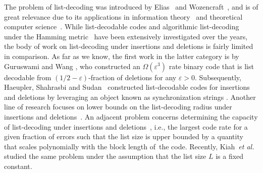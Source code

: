 \documentclass[conference, a4paper]{IEEEtran}
\begin{document}
The problem of list-decoding was introduced by Elias~\cite{elias1957list} and Wozencraft~\cite{wozencraft1958list}, and is of great relevance due to its applications in information theory~\cite{ahlswedeChannelCapacitiesList1973, Blinovskii1986, eliasErrorcorrectingCodesList1991} and theoretical computer science~\cite{caiHardnessPermanent1999, guruswami2009unbalanced, sivakumarMembershipComparableSets1999, sudanPseudorandomGeneratorsXOR2001, lund2020list}. While list-decodable codes and algorithmic list-decoding under the Hamming metric~\cite{elias1957list, wozencraft1958list, sudan1997decoding, guruswami1998improved, sudanListDecodingAlgorithms2000, guruswamiAlgorithmicResultsList2006, guruswamiExplicitCodesAchieving2008, perniceListDecodingCapacityImplies2025, fathollahiTimeSpaceEfficientList2026} have been extensively investigated over the years, the body of work on list-decoding under insertions and deletions is fairly limited in comparison. As far as we know, the first work in the latter category is by Guruswami and Wang \cite{guruswami2017deletion}, who constructed an $\Omega(\varepsilon^3)$ rate binary code that is list decodable from $(1/2 - \varepsilon)$-fraction of deletions for any $\varepsilon > 0$. Subsequently, Haeupler, Shahrasbi and Sudan~\cite{haeupler2018synchronization} constructed list-decodable codes for insertions and deletions by leveraging an object known as synchronization strings \cite{haeupler2021synchronization}. 
Another line of research focuses on lower bounds on the list-decoding radius under insertions and deletions~\cite{wachter-zehListDecodingInsertions2018, hayashiListDecodabilityInsertions2020, liuLowerBoundListDecodability2023, yangImprovedJohnsontypeBounds2026}. 
An adjacent problem concerns determining the capacity of list-decoding under insertions and deletions~\cite{guruswami2017deletion, haeupler2018synchronization, guruswami2020optimally, haeuplerRateDistanceTradeoffsListDecodable2022, conInsertionListDecodingCapacity2026}, i.e., the largest code rate for a given fraction of errors such that the list size is upper bounded by a quantity that scales polynomially with the block length of~the code. Recently, Kiah~\textit{et al.}~\cite{kiahConstantListInsertionDeletionCodes2026} studied the same problem under the assumption that the list size $L$ is a fixed constant.
\end{document}
